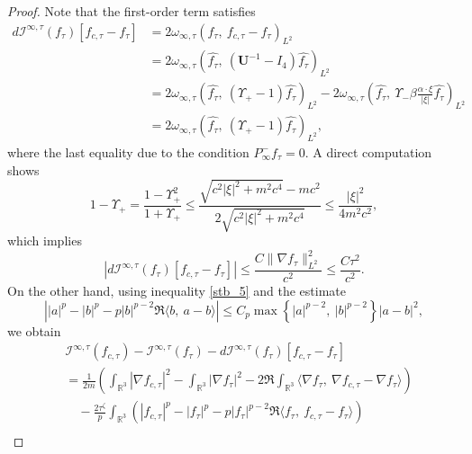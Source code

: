 \documentclass{amsart}
\theoremstyle{plain}
\theoremstyle{definition}
\theoremstyle{remark}
\numberwithin{equation}{section} \numberwithin{figure}{section}
\begin{document}
\begin{proof}
        Note that the first-order term satisfies
        \begin{equation*}
        \begin{aligned}
        d\mathcal{I}^{\infty,\tau}(f_\tau)[f_{c,\tau} - f_\tau] 
        &= 2\omega_{\infty,\tau} \left( f_\tau,\ f_{c,\tau} - f_\tau \right)_{L^2} \\
        &= 2\omega_{\infty,\tau} \left( \widehat{f_\tau},\ (\mathbf{U}^{-1} - I_4) \widehat{f_\tau} \right)_{L^2} \\
        &= 2\omega_{\infty,\tau} \left( \widehat{f_\tau},\ (\Upsilon_+ - 1) \widehat{f_\tau} \right)_{L^2} - 2\omega_{\infty,\tau} \left( \widehat{f_\tau},\ \Upsilon_- \beta \frac{\alpha \cdot \xi}{|\xi|} \widehat{f_\tau} \right)_{L^2} \\
        &= 2\omega_{\infty,\tau} \left( \widehat{f_\tau},\ (\Upsilon_+ - 1) \widehat{f_\tau} \right)_{L^2},
        \end{aligned}
        \end{equation*}
        where the last equality due to the condition $P_\infty^- f_\tau = 0$. A direct computation shows
        \[
        1 - \Upsilon_+ = \frac{1 - \Upsilon_+^2}{1 + \Upsilon_+} \leq \frac{\sqrt{c^2|\xi|^2 + m^2c^4} - mc^2}{2\sqrt{c^2|\xi|^2 + m^2c^4}} \leq \frac{|\xi|^2}{4m^2c^2},
        \]
        which implies
        \begin{equation}\label{llp_1}
        \left| d\mathcal{I}^{\infty,\tau}(f_\tau)[f_{c,\tau} - f_\tau] \right| \leq \frac{C \| \nabla f_\tau \|_{L^2}^2}{c^2} \leq \frac{C\tau^2}{c^2}.
        \end{equation}
        On the other hand, using inequality \eqref{stb_5} and the estimate
        \[
        \left| |a|^p - |b|^p - p|b|^{p-2} \Re \langle b,\ a - b \rangle \right| \leq C_p \max\left\{ |a|^{p-2},\ |b|^{p-2} \right\} |a - b|^2,
        \]
        we obtain
        \begin{equation}\label{new_b1}
        \begin{aligned}
        &\mathcal{I}^{\infty,\tau}(f_{c,\tau}) - \mathcal{I}^{\infty,\tau}(f_\tau) - d\mathcal{I}^{\infty,\tau}(f_\tau)[f_{c,\tau} - f_\tau] \\
        &= \frac{1}{2m} \left( \int_{\mathbb{R}^3} |\nabla f_{c,\tau}|^2 - \int_{\mathbb{R}^3} |\nabla f_\tau|^2 - 2\Re \int_{\mathbb{R}^3} \langle \nabla f_\tau,\ \nabla f_{c,\tau} - \nabla f_\tau \rangle \right) \\
        &\quad - \frac{2\tau^\zeta}{p} \int_{\mathbb{R}^3} \left( |f_{c,\tau}|^p - |f_\tau|^p - p|f_\tau|^{p-2} \Re \langle f_\tau,\ f_{c,\tau} - f_\tau \rangle \right) \\

\end{aligned}
\end{equation}
\end{proof}
\end{document}
